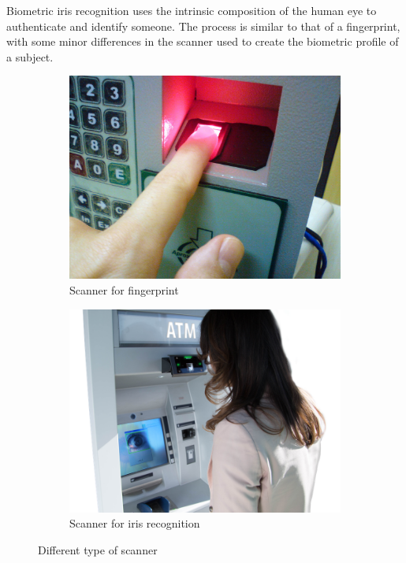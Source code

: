 \documentclass{article}
\begin{document}
Biometric iris recognition uses the intrinsic composition of the human eye to authenticate and identify someone.
The process is similar to that of a fingerprint, with some minor differences in the scanner used to create the biometric profile of a subject.

\begin{figure}[htbp]
    \centering
    \begin{subfigure}[t]{0.45\textwidth}
        \centering
        \includegraphics[width=\linewidth]{Images/Theory/Fingerprint_scanner_identification.jpg}
        \caption{Scanner for fingerprint}
        \label{fig:scanner_fingerprint}
    \end{subfigure}
    \hfill
    \begin{subfigure}[t]{0.45\textwidth}
        \centering
        \includegraphics[width=\linewidth]{Images/Theory/eye.png}
        \caption{Scanner for iris recognition}
        \label{fig:scanner_eye}
    \end{subfigure}
    \caption{Different type of scanner}
    \label{fig:scanners}
\end{figure}
\end{document}
